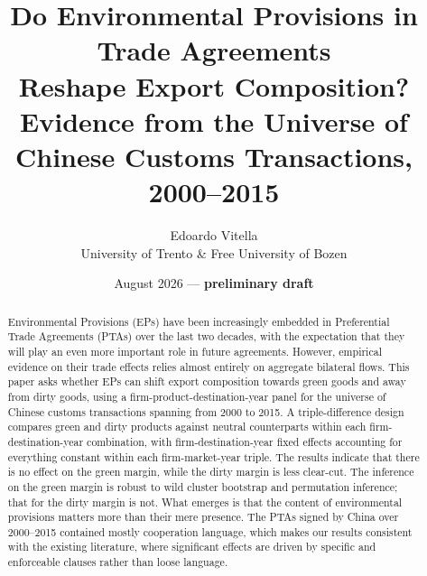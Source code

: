 \documentclass[12pt]{article}
\title{Do Environmental Provisions in Trade Agreements\\ Reshape Export Composition?\\
\large Evidence from the Universe of Chinese Customs Transactions, 2000--2015}
\author{Edoardo Vitella\\
\small University of Trento \& Free University of Bozen}
\date{August 2026 --- \textbf{preliminary draft}}
\begin{document}
\maketitle

\begin{abstract}
\noindent
\noindent
Environmental Provisions (EPs) have been increasingly embedded in Preferential Trade Agreements (PTAs) over the last two decades, with the expectation that they will play an even more important role in future agreements. However, empirical evidence on their trade effects relies almost entirely on aggregate bilateral flows. This paper asks whether EPs can shift export composition towards green goods and away from dirty goods, using a firm-product-destination-year panel for the universe of Chinese customs transactions spanning from 2000 to 2015. A triple-difference design compares green and dirty products against neutral counterparts within each firm-destination-year combination, with firm-destination-year fixed effects accounting for everything constant within each firm-market-year triple. The results indicate that there is no effect on the green margin, while the dirty margin is less clear-cut. The inference on the green margin is robust to wild cluster bootstrap and permutation inference; that for the dirty margin is not. What emerges is that the content of environmental provisions matters more than their mere presence. The PTAs signed by China over 2000--2015 contained mostly cooperation language, which makes our results consistent with the existing literature, where significant effects are driven by specific and enforceable clauses rather than loose language.







\end{abstract}
\end{document}
